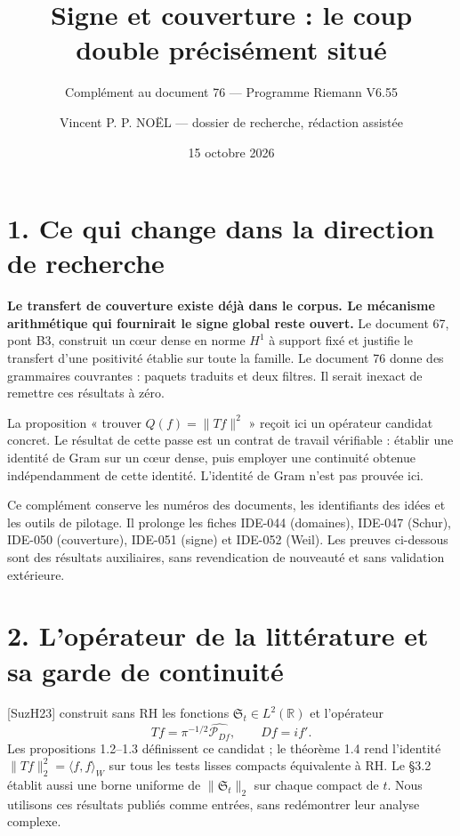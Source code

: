 \documentclass[
  11pt,
]{article}
\title{Signe et couverture : le coup double précisément situé}
\subtitle{Complément au document 76 --- Programme Riemann V6.55}
\author{Vincent P. P. NOËL --- dossier de recherche, rédaction assistée}
\date{15 octobre 2026}
\begin{document}
\maketitle

\hypertarget{ce-qui-change-dans-la-direction-de-recherche}{%
\section{1. Ce qui change dans la direction de
recherche}\label{ce-qui-change-dans-la-direction-de-recherche}}

\textbf{Le transfert de couverture existe déjà dans le corpus. Le
mécanisme arithmétique qui fournirait le signe global reste ouvert.} Le
document 67, pont B3, construit un cœur dense en norme \(H^1\) à support
fixé et justifie le transfert d'une positivité établie sur toute la
famille. Le document 76 donne des grammaires couvrantes : paquets
traduits et deux filtres. Il serait inexact de remettre ces résultats à
zéro.

La proposition « trouver \(Q(f)=\|Tf\|^2\) » reçoit ici un opérateur
candidat concret. Le résultat de cette passe est un contrat de travail
vérifiable : établir une identité de Gram sur un cœur dense, puis
employer une continuité obtenue indépendamment de cette identité.
L'identité de Gram n'est pas prouvée ici.

Ce complément conserve les numéros des documents, les identifiants des
idées et les outils de pilotage. Il prolonge les fiches IDE-044
(domaines), IDE-047 (Schur), IDE-050 (couverture), IDE-051 (signe) et
IDE-052 (Weil). Les preuves ci-dessous sont des résultats auxiliaires,
sans revendication de nouveauté et sans validation extérieure.

\hypertarget{lopuxe9rateur-de-la-littuxe9rature-et-sa-garde-de-continuituxe9}{%
\section{2. L'opérateur de la littérature et sa garde de
continuité}\label{lopuxe9rateur-de-la-littuxe9rature-et-sa-garde-de-continuituxe9}}

{[}SuzH23{]} construit sans RH les fonctions
\(\mathfrak S_t\in L^2(\mathbb R)\) et l'opérateur \[
T f=\pi^{-1/2}\widehat{\mathcal P_{Df}},\qquad Df=if'.
\] Les propositions 1.2--1.3 définissent ce candidat ; le théorème 1.4
rend l'identité \(\|Tf\|_2^2=\langle f,f\rangle_W\) sur tous les tests
lisses compacts équivalente à RH. Le §3.2 établit aussi une borne
uniforme de \(\|\mathfrak S_t\|_2\) sur chaque compact de \(t\). Nous
utilisons ces résultats publiés comme entrées, sans redémontrer leur
analyse complexe.
\end{document}
